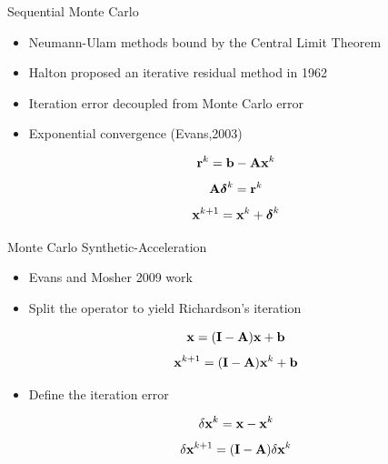 \documentclass{beamer}
\begin{document}
\begin{frame}{Sequential Monte Carlo}

  \begin{itemize}
  \item Neumann-Ulam methods bound by the Central Limit Theorem
  \item Halton proposed an iterative residual method in 1962
  \item Iteration error decoupled from Monte Carlo error
  \item Exponential convergence (Evans,2003)
  \end{itemize}

  \[
  \mathbf{r}^k = \mathbf{b} - \mathbf{A}\mathbf{x}^k
  \]
  \[
  \mathbf{A}\boldsymbol{\delta}^{k} = \mathbf{r}^{k}
  \]
  \[
  \mathbf{x}^{k+1} = \mathbf{x}^k + \boldsymbol{\delta}^{k}
  \]

\end{frame}

\begin{frame}{Monte Carlo Synthetic-Acceleration}
  \begin{itemize}
  \item Evans and Mosher 2009 work
  \item Split the operator to yield Richardson's iteration
  \end{itemize}

  \[
  \mathbf{x} = (\mathbf{I} - \mathbf{A})\mathbf{x} + \mathbf{b}
  \]
  \[
  \mathbf{x}^{k+1} = (\mathbf{I} - \mathbf{A})\mathbf{x}^k + \mathbf{b}
  \]

  \begin{itemize}
  \item Define the iteration error
  \end{itemize}

  \[
  \delta \mathbf{x}^k = \mathbf{x} - \mathbf{x}^k
  \]
  \[
  \delta \mathbf{x}^{k+1} = (\mathbf{I} - \mathbf{A})\delta \mathbf{x}^k
  \]

\end{frame}
\end{document}
